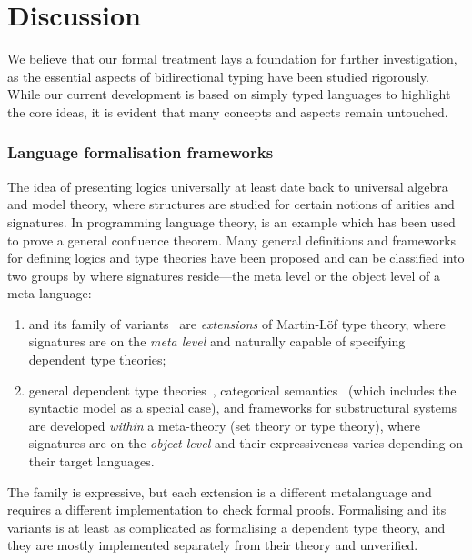 
\section{Discussion} \label{sec:future}
We believe that our formal treatment lays a foundation for further investigation, as the essential aspects of bidirectional typing have been studied rigorously. 
While our current development is based on simply typed languages to highlight the core ideas, it is evident that many concepts and aspects remain untouched.
\subsubsection{Language formalisation frameworks}

The idea of presenting logics universally at least date back to universal algebra and model theory, where structures are studied for certain notions of arities and signatures.
In programming language theory,  is an example which has been used to prove a general confluence theorem.
Many general definitions and frameworks for defining logics and type theories have been proposed and can be classified into two groups by where signatures reside---the meta level or the object level of a meta-language:
\begin{enumerate}
  \item {} and its family of variants~\cite{Harper2007,Reed2008,Assaf2016,Felicissimo2023} are \emph{extensions} of Martin-L\"of type theory, where signatures are on the \emph{meta level} and naturally capable of specifying dependent type theories;
\item general dependent type theories~\cite{Bauer2020,Haselwarter2021,Bauer2022a,Uemura2021}, categorical semantics~\cite{Fiore1999,Tanaka2006,Tanaka2006a,Fiore2010,Hamana2011,Fiore2013,Arkor2020,Fiore2022} (which includes the syntactic model as a special case), and frameworks for substructural systems~\cite{Tanaka2006,Tanaka2006a,Wood2022} are developed \emph{within} a meta-theory (set theory or type theory), where signatures are on the \emph{object level} and their expressiveness varies depending on their target languages.
\end{enumerate}

The \LF family is expressive, but each extension is a different metalanguage and requires a different implementation to check formal \LF proofs.
Formalising \LF and its variants is at least as complicated as formalising a dependent type theory, and they are mostly implemented separately from their theory and unverified.

